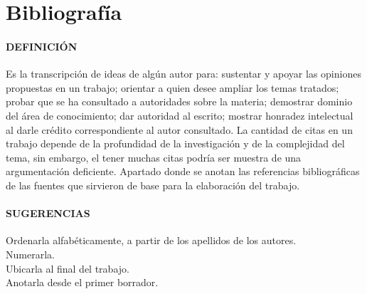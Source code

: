 \noindent 
\section{Bibliografía}
\paragraph{DEFINICI\'{O}N}
Es la transcripción de ideas de algún autor para: sustentar y apoyar las opiniones propuestas en un trabajo; orientar a quien desee ampliar los temas tratados; probar que se ha consultado a autoridades sobre la materia; demostrar dominio del área de conocimiento; dar autoridad al escrito; mostrar honradez intelectual al darle crédito correspondiente al autor consultado. La cantidad de citas en un trabajo depende de la profundidad de la investigación y de la complejidad del tema, sin embargo, el tener muchas citas podría ser muestra de una argumentación deficiente. Apartado donde se anotan las referencias bibliogr\'{a}ficas de las fuentes que sirvieron de base para la elaboraci\'{o}n del trabajo.\\

\paragraph{SUGERENCIAS}
Ordenarla alfab\'{e}ticamente, a partir de los apellidos de los autores.\\
Numerarla.\\
Ubicarla al final del trabajo.\\
Anotarla desde el primer borrador.\\
